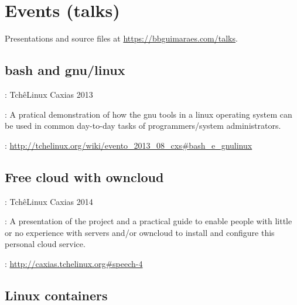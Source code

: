 \section*{Events (talks)}

Presentations and source files at \url{https://bbguimaraes.com/talks}.

\subsection*{bash and gnu/linux}

\begin{description}[noitemsep]
    \item[Event]: TchêLinux Caxias  2013
    \item[Summary]:
        A pratical demonstration of how the gnu tools in a linux operating
        system can be used in common day-to-day tasks of programmers/system
        administrators.
    \item[Website]:
        \url{http://tchelinux.org/wiki/evento_2013_08_cxs#bash_e_gnulinux}
\end{description}

\subsection*{Free cloud with owncloud}

\begin{description}[noitemsep]
    \item[Event]: TchêLinux Caxias 2014
    \item[Summary]:
        A presentation of the project and a practical guide to enable people
        with little or no experience with servers and/or owncloud to install
        and configure this personal cloud service.
    \item[Website]: \url{http://caxias.tchelinux.org#speech-4}
\end{description}

\subsection*{Linux containers}

